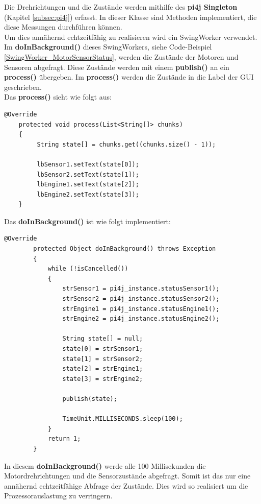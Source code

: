 Die Drehrichtungen und die Zustände werden mithilfe des \textbf{pi4j Singleton} (Kapitel \ref{subsec:pi4j}) erfasst. In dieser Klasse sind Methoden implementiert, die diese Messungen durchführen können.
\\ Um dies annähernd echtzeitfähig zu realisieren wird ein SwingWorker verwendet. Im \textbf{doInBackground()} dieses SwingWorkers, siehe Code-Beispiel \ref{SwingWorker_MotorSensorStatus}, werden die Zustände der Motoren und Sensoren abgefragt. Diese Zustände werden mit einem \textbf{publish()} an ein \textbf{process()} übergeben. Im \textbf{process()} werden die Zustände in die Label der GUI geschrieben.
\\ Das \textbf{process()} sieht wie folgt aus:
\begin{lstlisting}[style=JavaStyle, caption= Label aktualisieren]
	@Override
    protected void process(List<String[]> chunks)
    {
         String state[] = chunks.get((chunks.size() - 1));
            
         lbSensor1.setText(state[0]);
         lbSensor2.setText(state[1]);
         lbEngine1.setText(state[2]);
         lbEngine2.setText(state[3]);
    } 
\end{lstlisting}
Das \textbf{doInBackground()} ist wie folgt implementiert:
\begin{lstlisting}[style=JavaStyle, caption= Motor- und Sensorzustände, label=SwingWorker_MotorSensorStatus]
	@Override
        protected Object doInBackground() throws Exception
        {                        
            while (!isCancelled())
            {
                strSensor1 = pi4j_instance.statusSensor1();
                strSensor2 = pi4j_instance.statusSensor2();
                strEngine1 = pi4j_instance.statusEngine1();
                strEngine2 = pi4j_instance.statusEngine2();
                
                String state[] = null;
                state[0] = strSensor1;
                state[1] = strSensor2;
                state[2] = strEngine1;
                state[3] = strEngine2;
                
                publish(state);
                
                TimeUnit.MILLISECONDS.sleep(100);
            } 
            return 1;            
        }

\end{lstlisting}
In diesem \textbf{doInBackground()} werde  alle 100 Millisekunden die Motordrehrichtungen und die Sensorzustände abgefragt. Somit ist das nur eine annähernd echtzeitfähige Abfrage der Zustände. Dies wird so realisiert um die Prozessorauslastung zu verringern.

